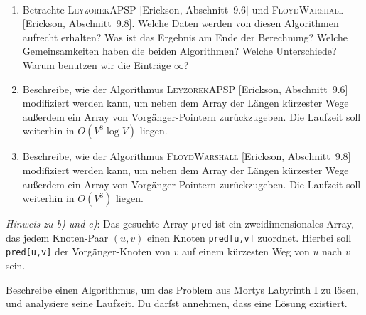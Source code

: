 \documentclass{uebung_cs}
\begin{document}
\begin{exercise}
\ 
  \begin{enumerate}
    \item \intro
    Betrachte \textsc{LeyzorekAPSP} [Erickson, Abschnitt~9.6] und \textsc{FloydWarshall} [Erickson, Abschnitt~9.8].
    Welche Daten werden von diesen Algorithmen aufrecht erhalten?
    Was ist das Ergebnis am Ende der Berechnung?
    Welche Gemeinsamkeiten haben die beiden Algorithmen?
    Welche Unterschiede?
    Warum benutzen wir die Einträge $\infty$?
    \item \atschool Beschreibe, wie der Algorithmus \textsc{LeyzorekAPSP} [Erickson, Abschnitt~9.6] modifiziert werden kann, um neben dem Array der Längen kürzester Wege außerdem ein Array von Vorgänger-Pointern zurückzugeben.
    Die Laufzeit soll weiterhin in $O(V^3 \log V)$ liegen.
    \item \atschool Beschreibe, wie der Algorithmus \textsc{FloydWarshall} [Erickson, Abschnitt~9.8] modifiziert werden kann, um neben dem Array der Längen kürzester Wege außerdem ein Array von Vorgänger-Pointern zurückzugeben.
    Die Laufzeit soll weiterhin in $O(V^3)$ liegen.
  \end{enumerate}
  \emph{Hinweis zu b) und c)}: Das gesuchte Array \texttt{pred} ist ein zweidimensionales Array, das jedem Knoten-Paar $(u,v)$ einen Knoten \texttt{pred[u,v]} zuordnet. Hierbei soll \texttt{pred[u,v]} der Vorgänger-Knoten von $v$ auf einem kürzesten Weg von $u$ nach $v$ sein.
\end{exercise}

\begin{exercise}
  Beschreibe einen Algorithmus, um das Problem aus Mortys Labyrinth I zu lösen, und analysiere seine Laufzeit.
  Du darfst annehmen, dass eine Lösung existiert.
\end{exercise}
\end{document}
